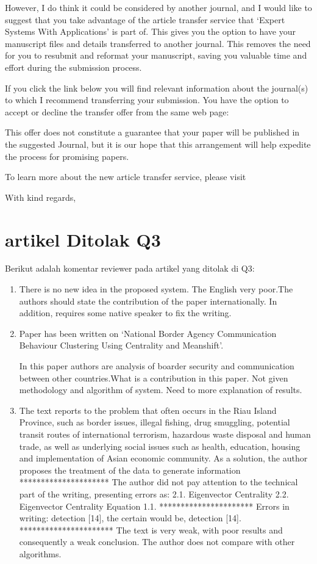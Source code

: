 \begin{enumerate}
	However, I do think it could be considered by another journal, and I would like to suggest that you take advantage of the article transfer service that `Expert Systems With Applications' is part of. This gives you the option to have your manuscript files and details transferred to another journal. This removes the need for you to resubmit and reformat your manuscript, saving you valuable time and effort during the submission process.

	If you click the link below you will find relevant information about the journal(s) to which I recommend transferring your submission. You have the option to accept or decline the transfer offer from the same web page:

	This offer does not constitute a guarantee that your paper will be published in the suggested Journal, but it is our hope that this arrangement will help expedite the process for promising papers.

	To learn more about the new article transfer service, please visit

	With kind regards,
\end{enumerate}

\section{artikel Ditolak Q3}
Berikut adalah komentar reviewer pada artikel yang ditolak di Q3:
\begin{enumerate}
	\item There is no new idea in the proposed system. The English very poor.The authors should state the contribution of the paper internationally. In addition, requires some native speaker to fix the writing.
	\item Paper has been written on `National Border Agency Communication Behaviour Clustering Using Centrality and Meanshift'. 

	In this paper authors are analysis of boarder security and communication between other countries.What is a contribution in this paper. Not given methodology and algorithm of system. Need to more explanation of results.
	\item The text reports to the problem that often occurs in the Riau Island Province, such as border issues, illegal fishing, drug smuggling, potential transit routes of international terrorism, hazardous waste disposal and human trade, as well as underlying social issues such as health, education, housing and implementation of Asian economic community. As a solution, the author proposes the treatment of the data to generate information
	*********************
	The author did not pay attention to the technical part of the writing, presenting errors as:
	2.1. Eigenvector Centrality 2.2. Eigenvector Centrality
	Equation 1.1.
	**********************
	Errors in writing: detection [14], the certain would be, detection [14].
	**********************
	The text is very weak, with poor results and consequently a weak conclusion. The author does not compare with other algorithms.
	
\end{enumerate}
